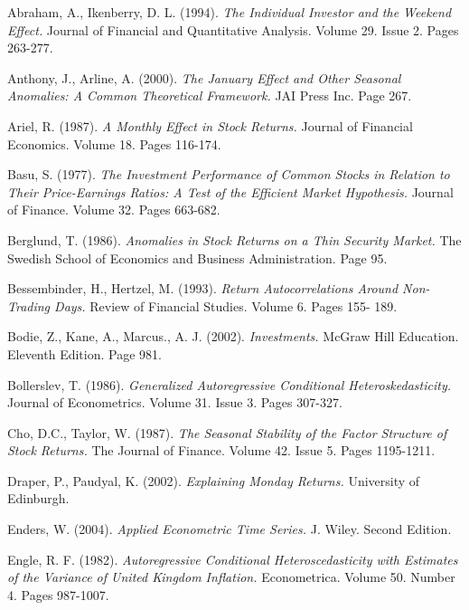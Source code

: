 \documentclass[11pt, english]{article}
\begin{document}
	\begin{thebibliography}{9}


		Abraham, A., Ikenberry, D. L. (1994).
		\textsl{The Individual Investor and the Weekend Effect.}
		Journal of Financial and Quantitative Analysis. Volume 29. Issue 2. Pages 263-277.
	
		Anthony, J., Arline, A. (2000).
		\textsl{The January Effect and Other Seasonal Anomalies: A Common Theoretical Framework.}
		JAI Press Inc. Page 267.

		Ariel, R. (1987).
		\textsl{A Monthly Effect in Stock Returns.}
		Journal of Financial Economics. Volume 18. Pages 116-174.


		Basu, S. (1977).
		\textsl{The Investment Performance of Common Stocks in Relation to Their Price-Earnings Ratios: A Test of the Efficient Market Hypothesis.}
		Journal of Finance. Volume 32. Pages 663-682.

		Berglund, T. (1986).
		\textsl{Anomalies in Stock Returns on a Thin Security Market.}
		The Swedish School of Economics and Business Administration. Page 95.

		Bessembinder, H., Hertzel, M. (1993).
		\textsl{Return Autocorrelations Around Non-Trading Days.}
		Review of Financial Studies. Volume 6. Pages 155- 189.
	
		Bodie, Z., Kane, A., Marcus., A. J. (2002).
		\textsl{Investments.}
		McGraw Hill Education. Eleventh Edition. Page 981.
	
		Bollerslev, T. (1986).
		\textsl{Generalized Autoregressive Conditional Heteroskedasticity.}
		Journal of Econometrics. Volume 31. Issue 3. Pages 307-327.


		Cho, D.C., Taylor, W. (1987).
		\textsl{The Seasonal Stability of the Factor Structure of Stock Returns.}
		The Journal of Finance. Volume 42. Issue 5. Pages 1195-1211.


		Draper, P., Paudyal, K. (2002).
		\textsl{Explaining Monday Returns.}
		University of Edinburgh.


		Enders, W. (2004).
		\textsl{Applied Econometric Time Series.}
		J. Wiley. Second Edition.

		Engle, R. F. (1982).
		\textsl{Autoregressive Conditional Heteroscedasticity with Estimates of the Variance of United Kingdom Inflation.}
		Econometrica. Volume 50. Number 4. Pages 987-1007.


\end{thebibliography}
\end{document}
